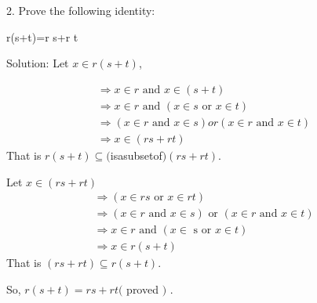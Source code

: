 \documentclass [7pt]{beamer}
\begin{document}
\begin{frame}	
2. Prove the following identity:


r(s+t)=r s+r t
\begin{flushleft}
Solution: Let $x \in r(s+t)$,
\end{flushleft}
$$
\begin{array}{l}
\Longrightarrow x \in r \text { and } x \in(s+t) \\
\Longrightarrow x \in r \text { and }(x \in s \text { or } x \in t) \\
\Longrightarrow(x \in r \text { and } x \in s) o r(x \in r \text { and } x \in t) \\
\Longrightarrow x \in(r s+r t)
\end{array}
$$
That is $r(s+t) \subseteq($isasubsetof$)(r s+r t)$.
\end{frame}
\begin{frame}
\justifying	
Let $x \in(r s+r t)$
$$
\begin{array}{l}
\Longrightarrow(x \in r s \text { or } x \in r t) \\
\Longrightarrow(x \in r \text { and } x \in s) \text { or }(x \in r \text { and } x \in t) \\
\Longrightarrow x \in r \text { and }(x \in \text { s or } x \in t) \\
\Longrightarrow x \in r(s+t)
\end{array}
$$
That is $(r s+r t) \subseteq r(s+t)$.


So, $r(s+t)=r s+r t($ proved $)$ .
\end{frame}
\end{document}

